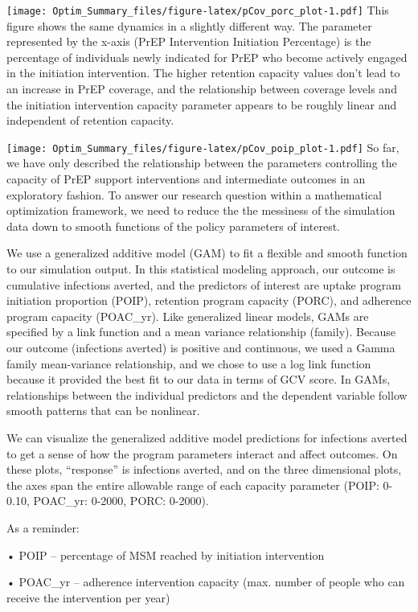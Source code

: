 \documentclass[
]{article}
\begin{document}
\texttt{[image: Optim\_Summary\_files/figure-latex/pCov\_porc\_plot-1.pdf]}
This figure shows the same dynamics in a slightly different way. The
parameter represented by the x-axis (PrEP Intervention Initiation
Percentage) is the percentage of individuals newly indicated for PrEP
who become actively engaged in the initiation intervention. The higher
retention capacity values don't lead to an increase in PrEP coverage,
and the relationship between coverage levels and the initiation
intervention capacity parameter appears to be roughly linear and
independent of retention capacity.

\texttt{[image: Optim\_Summary\_files/figure-latex/pCov\_poip\_plot-1.pdf]}
So far, we have only described the relationship between the parameters
controlling the capacity of PrEP support interventions and intermediate
outcomes in an exploratory fashion. To answer our research question
within a mathematical optimization framework, we need to reduce the the
messiness of the simulation data down to smooth functions of the policy
parameters of interest.

We use a generalized additive model (GAM) to fit a flexible and smooth
function to our simulation output. In this statistical modeling
approach, our outcome is cumulative infections averted, and the
predictors of interest are uptake program initiation proportion (POIP),
retention program capacity (PORC), and adherence program capacity
(POAC\_yr). Like generalized linear models, GAMs are specified by a link
function and a mean variance relationship (family). Because our outcome
(infections averted) is positive and continuous, we used a Gamma family
mean-variance relationship, and we chose to use a log link function
because it provided the best fit to our data in terms of GCV score. In
GAMs, relationships between the individual predictors and the dependent
variable follow smooth patterns that can be nonlinear.

We can visualize the generalized additive model predictions for
infections averted to get a sense of how the program parameters interact
and affect outcomes. On these plots, ``response'' is infections averted,
and on the three dimensional plots, the axes span the entire allowable
range of each capacity parameter (POIP: 0-0.10, POAC\_yr: 0-2000, PORC:
0-2000).

As a reminder:

• POIP -- percentage of MSM reached by initiation intervention

• POAC\_yr -- adherence intervention capacity (max. number of people who
can receive the intervention per year)
\end{document}
